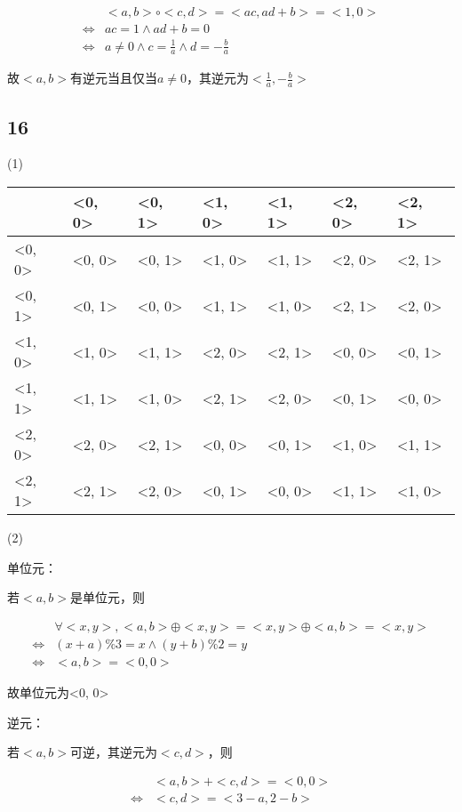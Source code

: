 \documentclass[UTF8]{ctexart}
\begin{document}
\[
\begin{aligned}
    &<a, b>\circ <c, d> = <ac, ad + b> = <1, 0>\\
    \Leftrightarrow &ac = 1 \land ad + b = 0\\
    \Leftrightarrow &a\neq 0 \land c = \frac{1}{a} \land d = -\frac{b}{a}
\end{aligned}    
\]

故$<a, b>$有逆元当且仅当$a \neq 0$，其逆元为$<\frac{1}{a}, -\frac{b}{a}>$

\subsection*{16}

(1)

\begin{tabularx}{\linewidth}{|X|X|X|X|X|X|X|}
\hline
        & <0, 0> & <0, 1> & <1, 0> & <1, 1> & <2, 0> & <2, 1>\\
\hline
<0, 0>  & <0, 0> & <0, 1> & <1, 0> & <1, 1> & <2, 0> & <2, 1>\\
\hline
<0, 1>  & <0, 1> & <0, 0> & <1, 1> & <1, 0> & <2, 1> & <2, 0>\\
\hline
<1, 0>  & <1, 0> & <1, 1> & <2, 0> & <2, 1> & <0, 0> & <0, 1>\\
\hline
<1, 1>  & <1, 1> & <1, 0> & <2, 1> & <2, 0> & <0, 1> & <0, 0>\\
\hline
<2, 0>  & <2, 0> & <2, 1> & <0, 0> & <0, 1> & <1, 0> & <1, 1>\\
\hline
<2, 1>  & <2, 1> & <2, 0> & <0, 1> & <0, 0> & <1, 1> & <1, 0>\\
\hline
\end{tabularx}

(2)

单位元：

若$<a, b>$是单位元，则

\[
\begin{aligned}
    &\forall <x, y>, <a, b> \oplus <x, y> = <x, y> \oplus <a, b> = <x, y>\\
    \Leftrightarrow &(x + a)\% 3 = x\land (y + b)\%2 = y\\
    \Leftrightarrow &<a, b> = <0, 0>
\end{aligned}    
\]

故单位元为<0, 0>

逆元：

若$<a, b>$可逆，其逆元为$<c, d>$，则

\[
\begin{aligned}
    &<a, b> + <c, d> = <0, 0>\\
    \Leftrightarrow &<c, d> = <3 - a, 2 - b>
\end{aligned}    
\]
\end{document}
